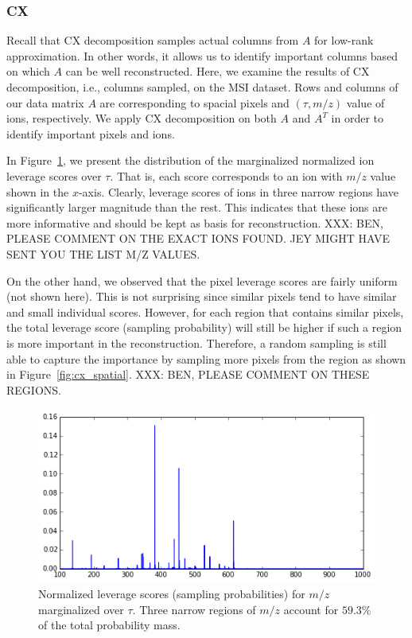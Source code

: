   \subsubsection{CX}
  Recall that CX decomposition samples actual columns from $A$ for low-rank approximation. In other words, it allows us to identify important columns based on which $A$ can be well reconstructed. Here, we examine the results of CX decomposition, i.e., columns sampled, on the MSI dataset.
 Rows and columns of our data matrix $A$ are corresponding to spacial pixels and $(\tau, m/z)$ value of ions, respectively. We apply CX decomposition on both $A$ and $A^T$ in order to identify important pixels and ions.
   
  In Figure~\ref{fig:cx_ions}, we present the distribution of the marginalized normalized ion leverage scores over $\tau$. That is, each score corresponds to an ion with $m/z$ value shown in the $x$-axis. Clearly, leverage scores of ions in three narrow regions have significantly larger magnitude than the rest. This indicates that these ions are more informative and should be kept as basis for reconstruction.  {\color{red} XXX: BEN, PLEASE COMMENT ON THE EXACT IONS FOUND. JEY MIGHT HAVE SENT YOU THE LIST M/Z VALUES. }
  
  On the other hand, we observed that the pixel leverage scores are fairly uniform (not shown here). This is not surprising since similar pixels tend to have similar and small individual scores. However, for each region that contains similar pixels, the total leverage score (sampling probability) will still be higher if such a region is more important in the reconstruction. Therefore, a random sampling is still able to capture the importance by sampling more pixels from the region as shown in Figure~\ref{fig:cx_spatial}.
  {\color{red} XXX: BEN, PLEASE COMMENT ON THESE REGIONS. }
    
    \begin{figure} [h!btp]
    \begin{centering}
    \includegraphics[width=\linewidth]{images/cx_ions.png}
    \end{centering}
    \caption{Normalized leverage scores (sampling probabilities) for $m/z$ marginalized over $\tau$.
      Three narrow regions of $m/z$ account for $59.3\%$ of the total probability mass.}
    \label{fig:cx_ions}
    \end{figure} 
    
